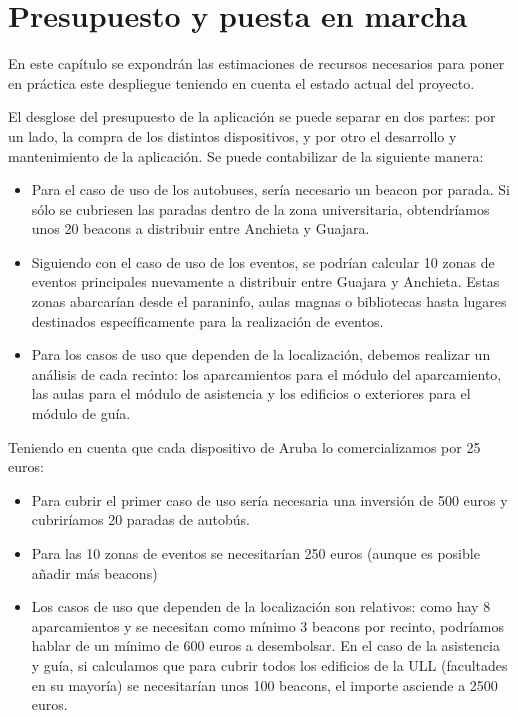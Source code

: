 %
%
%

\chapter{Presupuesto y puesta en marcha} \label{chap:presupuesto} 

En este capítulo se expondrán las estimaciones de recursos necesarios para poner en práctica este despliegue teniendo en cuenta el estado actual del proyecto. 

El desglose del presupuesto de la aplicación se puede separar en dos partes: por un lado, la compra de los distintos dispositivos, y por otro el desarrollo y mantenimiento de la aplicación. Se puede contabilizar de la siguiente manera: 

\begin{itemize}
\item Para el caso de uso de los autobuses, sería necesario un beacon por parada. Si sólo se cubriesen las paradas dentro de la zona universitaria, obtendríamos unos 20 beacons a distribuir entre Anchieta y Guajara.
\item Siguiendo con el caso de uso de los eventos, se podrían calcular  10 zonas de eventos principales nuevamente a distribuir entre Guajara y Anchieta. Estas zonas abarcarían desde el paraninfo, aulas magnas o bibliotecas hasta lugares destinados específicamente para la realización de eventos.
\item Para los casos de uso que dependen de la localización, debemos realizar un análisis de cada recinto: los aparcamientos para el módulo del aparcamiento, las aulas para el módulo de asistencia y los edificios o exteriores para el módulo de guía.
\end{itemize}

Teniendo en cuenta que cada dispositivo de Aruba lo comercializamos por 25 euros:

 
\begin{itemize}
\item Para cubrir el primer caso de uso sería necesaria una inversión de 500 euros y cubriríamos 20 paradas de autobús.
\item Para las 10 zonas de eventos se necesitarían 250 euros (aunque es posible añadir más beacons)
\item Los casos de uso que dependen de la localización son relativos: como hay 8 aparcamientos y se necesitan como mínimo 3 beacons por recinto, podríamos hablar de un mínimo de 600 euros a desembolsar. En el caso de la asistencia y guía, si calculamos  que para cubrir todos los edificios de la ULL (facultades en su mayoría) se necesitarían unos 100 beacons, el importe asciende a 2500 euros.
\end{itemize}


